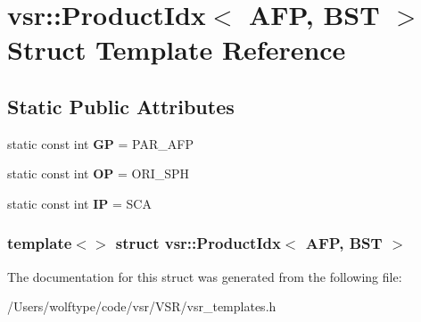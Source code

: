 \hypertarget{structvsr_1_1_product_idx_3_01_a_f_p_00_01_b_s_t_01_4}{\section{vsr\-:\-:Product\-Idx$<$ A\-F\-P, B\-S\-T $>$ Struct Template Reference}
\label{structvsr_1_1_product_idx_3_01_a_f_p_00_01_b_s_t_01_4}
}
\subsection*{Static Public Attributes}
\begin{DoxyCompactItemize}
\item 
\hypertarget{structvsr_1_1_product_idx_3_01_a_f_p_00_01_b_s_t_01_4_a530acb791768f33986d4464edc63177f}{static const int {\bfseries G\-P} = P\-A\-R\-\_\-\-A\-F\-P}\label{structvsr_1_1_product_idx_3_01_a_f_p_00_01_b_s_t_01_4_a530acb791768f33986d4464edc63177f}

\item 
\hypertarget{structvsr_1_1_product_idx_3_01_a_f_p_00_01_b_s_t_01_4_a7a68e8469142d1f3c145e565ae414678}{static const int {\bfseries O\-P} = O\-R\-I\-\_\-\-S\-P\-H}\label{structvsr_1_1_product_idx_3_01_a_f_p_00_01_b_s_t_01_4_a7a68e8469142d1f3c145e565ae414678}

\item 
\hypertarget{structvsr_1_1_product_idx_3_01_a_f_p_00_01_b_s_t_01_4_a5f00e0151d4289538ec5578aaaf71a3a}{static const int {\bfseries I\-P} = S\-C\-A}\label{structvsr_1_1_product_idx_3_01_a_f_p_00_01_b_s_t_01_4_a5f00e0151d4289538ec5578aaaf71a3a}

\end{DoxyCompactItemize}
\subsubsection*{template$<$$>$ struct vsr\-::\-Product\-Idx$<$ A\-F\-P, B\-S\-T $>$}



The documentation for this struct was generated from the following file\-:\begin{DoxyCompactItemize}
\item 
/\-Users/wolftype/code/vsr/\-V\-S\-R/vsr\-\_\-templates.\-h\end{DoxyCompactItemize}
